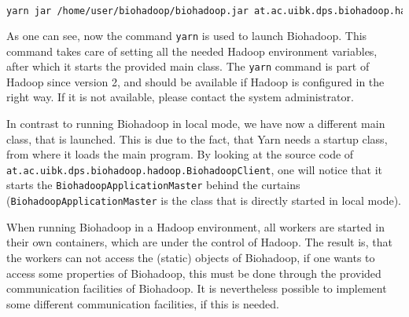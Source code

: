   \begin{lstlisting}[language=bash]
yarn jar /home/user/biohadoop/biohadoop.jar at.ac.uibk.dps.biohadoop.hadoop.BiohadoopClient /biohadoop/configs/simple-config-json
  \end{lstlisting}

  As one can see, now the command \texttt{yarn} is used to launch Biohadoop. This command takes care of setting all the needed Hadoop environment variables, after which it starts the provided main class. The \texttt{yarn} command is part of Hadoop since version 2, and should be available if Hadoop is configured in the right way. If it is not available, please contact the system administrator.
  
  In contrast to running Biohadoop in local mode, we have now a different main class, that is launched. This is due to the fact, that Yarn needs a startup class, from where it loads the main program. By looking at the source code of \texttt{at.ac.uibk.dps.biohadoop.hadoop.BiohadoopClient}, one will notice that it starts the \texttt{BiohadoopApplicationMaster} behind the curtains (\texttt{BiohadoopApplicationMaster} is the class that is directly started in local mode).
  
  When running Biohadoop in a Hadoop environment, all workers are started in their own containers, which are under the control of Hadoop. The result is, that the workers can not access the (static) objects of Biohadoop, if one wants to access some properties of Biohadoop, this must be done through the provided communication facilities of Biohadoop. It is nevertheless possible to implement some different communication facilities, if this is needed.